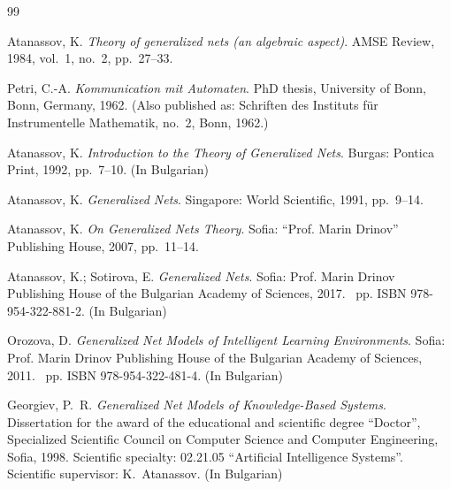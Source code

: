 \clearpage
{}
{}

\begin{thebibliography}{99}


Atanassov, K.
\newblock \emph{Theory of generalized nets (an algebraic aspect)}.
\newblock AMSE Review, 1984, vol.~1, no.~2, pp.~27--33.

Petri, C.-A.
\newblock \emph{Kommunication mit Automaten}.
\newblock PhD thesis, University of Bonn, Bonn, Germany, 1962.
\newblock (Also published as: Schriften des Instituts f{\"u}r Instrumentelle Mathematik, no.~2, Bonn, 1962.)

Atanassov, K.
\newblock \emph{Introduction to the Theory of Generalized Nets}.
\newblock Burgas: Pontica Print, 1992, pp.~7--10.
\newblock (In Bulgarian)

Atanassov, K.
\newblock \emph{Generalized Nets}.
\newblock Singapore: World Scientific, 1991, pp.~9--14.

Atanassov, K.
\newblock \emph{On Generalized Nets Theory}.
\newblock Sofia: ``Prof. Marin Drinov'' Publishing House, 2007, pp.~11--14.

Atanassov, K.; Sotirova, E.
\newblock \emph{Generalized Nets}.
\newblock \textnormal{Sofia:} Prof. Marin Drinov Publishing House of the Bulgarian Academy of Sciences, 2017.
~pp.
\newblock ISBN 978-954-322-881-2.
\newblock (In Bulgarian)

Orozova, D.
\newblock \emph{Generalized Net Models of Intelligent Learning Environments}.
\newblock \textnormal{Sofia:} Prof. Marin Drinov Publishing House of the Bulgarian Academy of Sciences, 2011.
~pp.
\newblock ISBN 978-954-322-481-4.
\newblock (In Bulgarian)

Georgiev, P.~R.
\newblock \emph{Generalized Net Models of Knowledge-Based Systems}.
\newblock Dissertation for the award of the educational and scientific degree ``Doctor'',
Specialized Scientific Council on Computer Science and Computer Engineering, Sofia, 1998.
\newblock Scientific specialty: 02.21.05 ``Artificial Intelligence Systems''.
\newblock Scientific supervisor: K.~Atanassov.
\newblock (In Bulgarian)


\end{thebibliography}
